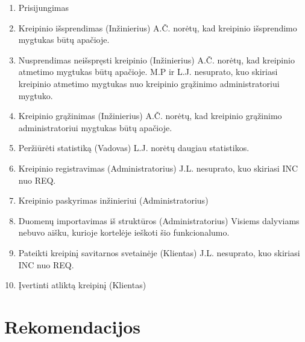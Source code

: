 		\begin{enumerate}
			\item Prisijungimas
			\item Kreipinio išsprendimas (Inžinierius)
				\subitem A.Č. norėtų, kad kreipinio išsprendimo mygtukas būtų apačioje.
			\item Nusprendimas neišspręsti kreipinio (Inžinierius)
				\subitem A.Č. norėtų, kad kreipinio atmetimo mygtukas būtų apačioje.
				\subitem M.P ir L.J. nesuprato, kuo skiriasi kreipinio atmetimo mygtukas nuo kreipinio grąžinimo administratoriui mygtuko.
			\item Kreipinio grąžinimas (Inžinierius)
				\subitem A.Č. norėtų, kad kreipinio grąžinimo administratoriui mygtukas būtų apačioje.
			\item Peržiūrėti statistiką (Vadovas)
				\subitem L.J. norėtų daugiau statistikos.
			\item Kreipinio registravimas (Administratorius)
				\subitem J.L. nesuprato, kuo skiriasi INC nuo REQ.
			\item Kreipinio paskyrimas inžinieriui (Administratorius)
			\item Duomenų importavimas iš struktūros (Administratorius)
				\subitem Visiems dalyviams nebuvo aišku, kurioje kortelėje ieškoti šio funkcionalumo.
			\item Pateikti kreipinį savitarnos svetainėje (Klientas)
				\subitem J.L. nesuprato, kuo skiriasi INC nuo REQ.
			\item Įvertinti atliktą kreipinį (Klientas)
		\end{enumerate}

\section{Rekomendacijos}

